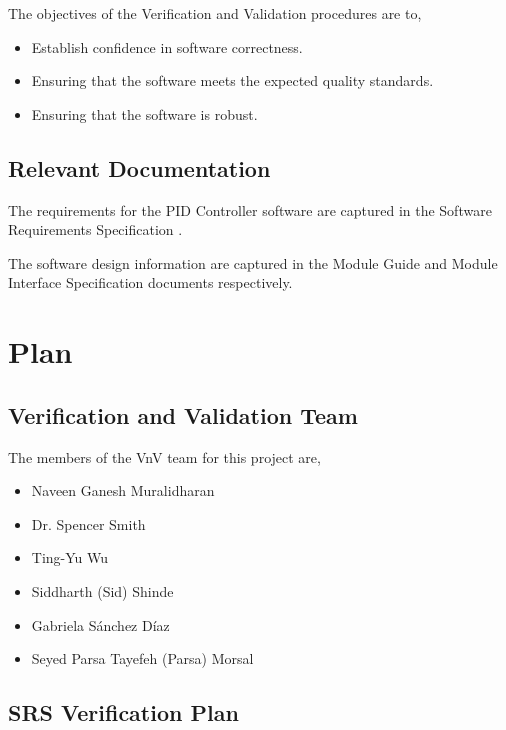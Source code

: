 \documentclass[12pt, titlepage]{article}
\begin{document}
The objectives of the Verification and Validation procedures are to,

\begin{itemize}
\item Establish confidence in software correctness.
\item Ensuring that the software meets the expected quality standards.
\item Ensuring that the software is robust.
\end{itemize}

\subsection{Relevant Documentation}


The requirements for the PID Controller software are captured in the Software
Requirements Specification \cite{SRS}.

The software design information are captured in the Module Guide  \cite{MG}
and Module Interface Specification \cite{MIS} documents respectively.

\section{Plan}
	
\subsection{Verification and Validation Team}


The members of the VnV team for this project are,

\begin{itemize}
\item Naveen Ganesh Muralidharan
\item Dr. Spencer Smith
\item Ting-Yu Wu	
\item Siddharth (Sid) Shinde
\item Gabriela Sánchez Díaz	
\item Seyed Parsa Tayefeh (Parsa) Morsal
\end{itemize}

\subsection{SRS Verification Plan}
\end{document}
